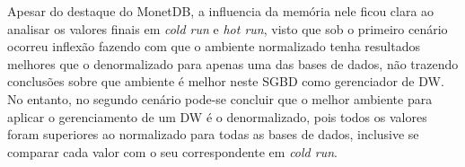 Apesar do destaque do MonetDB, a influencia da memória nele ficou clara ao analisar os valores finais em \textit{cold run} e \textit{hot run}, visto que sob o primeiro cenário ocorreu inflexão fazendo com que o ambiente normalizado tenha resultados melhores que o denormalizado para apenas uma das bases de dados, não trazendo conclusões sobre que ambiente é melhor neste SGBD como gerenciador de DW. No entanto, no segundo cenário pode-se concluir que o melhor ambiente para aplicar o gerenciamento de um DW é o denormalizado, pois todos os valores foram superiores ao normalizado para todas as bases de dados, inclusive se comparar cada valor com o seu correspondente em \textit{cold run}.